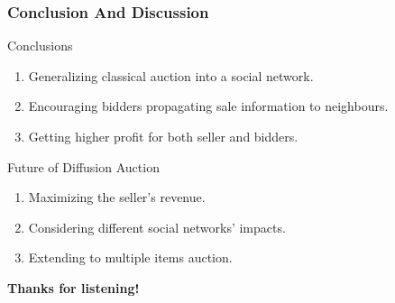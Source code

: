 \documentclass{beamer}
\begin{document}

\begin{frame}
\frametitle{Conclusion And Discussion}
\begin{block}{Conclusions}
\begin{enumerate}
\item Generalizing classical auction into a social network.
\item Encouraging bidders propagating sale information to neighbours.
\item Getting higher profit for both seller and bidders.
\end{enumerate}
\end{block}
\begin{block}{Future of Diffusion Auction}
\begin{enumerate}

\item Maximizing the seller's revenue.
\item Considering different social networks' impacts.
\item Extending to multiple items auction.
\end{enumerate}
\end{block}
\begin{center}
\Large{\textbf{Thanks for listening!}}
\end{center}
\end{frame}






\end{document}
